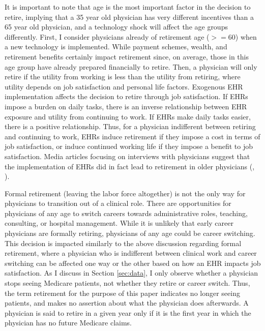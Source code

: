 \documentclass[12pt]{article}
\begin{document}
It is important to note that age is the most important factor in the decision to retire, implying that a 35 year old physician has very different incentives than a 65 year old physician, and a technology shock will affect the age groups differently. First, I consider physicians already of retirement age ($>=60$) when a new technology is implemented. While payment schemes, wealth, and retirement benefits certainly impact retirement since, on average, those in this age group have already prepared financially to retire. Then, a physician will only retire if the utility from working is less than the utility from retiring, where utility depends on job satisfaction and personal life factors. Exogenous EHR implementation affects the decision to retire through job satisfaction. If EHRs impose a burden on daily tasks, there is an inverse relationship between EHR exposure and utility from continuing to work. If EHRs make daily tasks easier, there is a positive relationship. Thus, for a physician indifferent between retiring and continuing to work, EHRs induce retirement if they impose a cost in terms of job satisfaction, or induce continued working life if they impose a benefit to job satisfaction. Media articles focusing on interviews with physicians suggest that the implementation of EHRs did in fact lead to retirement in older physicians (\cite{ringel_2019}, \cite{loria_2020}). 

Formal retirement (leaving the labor force altogether) is not the only way for physicians to transition out of a clinical role. There are opportunities for physicians of any age to switch careers towards administrative roles, teaching, consulting, or hospital management. While it is unlikely that early career physicians are formally retiring, physicians of any age could be career switching. This decision is impacted similarly to the above discussion regarding formal retirement, where a physician who is indifferent between clinical work and career switching can be affected one way or the other based on how an EHR impacts job satisfaction. As I discuss in Section \ref{sec:data}, I only observe whether a physician stops seeing Medicare patients, not whether they retire or career switch. Thus, the term retirement for the purpose of this paper indicates no longer seeing patients, and makes no assertion about what the physician does afterwards. A physician is said to retire in a given year only if it is the first year in which the physician has no future Medicare claims.
\end{document}
